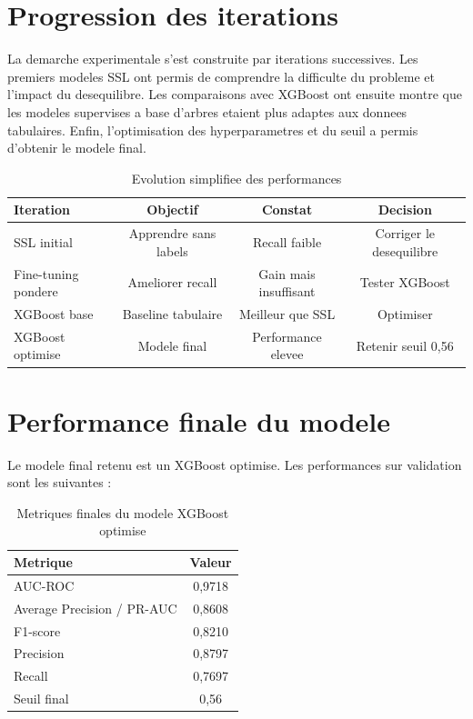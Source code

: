 ﻿\documentclass[12pt,a4paper,oneside]{report}
\begin{document}
\section{Progression des iterations}

La demarche experimentale s'est construite par iterations successives. Les premiers modeles SSL ont permis de comprendre la difficulte du probleme et l'impact du desequilibre. Les comparaisons avec XGBoost ont ensuite montre que les modeles supervises a base d'arbres etaient plus adaptes aux donnees tabulaires. Enfin, l'optimisation des hyperparametres et du seuil a permis d'obtenir le modele final.

\begin{table}[H]
\centering
\caption{Evolution simplifiee des performances}
\begin{tabular}{lccc}
\toprule
\textbf{Iteration} & \textbf{Objectif} & \textbf{Constat} & \textbf{Decision} \\
\midrule
SSL initial & Apprendre sans labels & Recall faible & Corriger le desequilibre \\
Fine-tuning pondere & Ameliorer recall & Gain mais insuffisant & Tester XGBoost \\
XGBoost base & Baseline tabulaire & Meilleur que SSL & Optimiser \\
XGBoost optimise & Modele final & Performance elevee & Retenir seuil 0,56 \\
\bottomrule
\end{tabular}
\end{table}

\section{Performance finale du modele}

Le modele final retenu est un XGBoost optimise. Les performances sur validation sont les suivantes :

\begin{table}[H]
\centering
\caption{Metriques finales du modele XGBoost optimise}
\begin{tabular}{lc}
\toprule
\textbf{Metrique} & \textbf{Valeur} \\
\midrule
AUC-ROC & 0,9718 \\
Average Precision / PR-AUC & 0,8608 \\
F1-score & 0,8210 \\
Precision & 0,8797 \\
Recall & 0,7697 \\
Seuil final & 0,56 \\
\bottomrule
\end{tabular}
\end{table}
\end{document}
